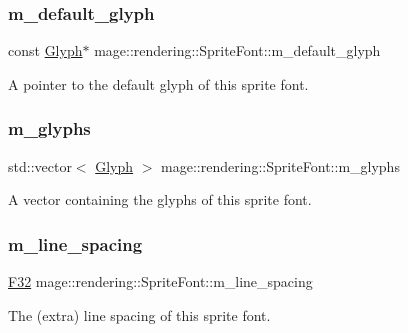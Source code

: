 \subsubsection{\texorpdfstring{m\+\_\+default\+\_\+glyph}{m\_default\_glyph}}
{\footnotesize\ttfamily const \hyperlink{structmage_1_1rendering_1_1_glyph}{Glyph}$\ast$ mage\+::rendering\+::\+Sprite\+Font\+::m\+\_\+default\+\_\+glyph\hspace{0.3cm}{\ttfamily [private]}}

A pointer to the default glyph of this sprite font. \hypertarget{classmage_1_1rendering_1_1_sprite_font_aba69731bf4701ab790b1575515de22b9}{}\label{classmage_1_1rendering_1_1_sprite_font_aba69731bf4701ab790b1575515de22b9} 
\subsubsection{\texorpdfstring{m\+\_\+glyphs}{m\_glyphs}}
{\footnotesize\ttfamily std\+::vector$<$ \hyperlink{structmage_1_1rendering_1_1_glyph}{Glyph} $>$ mage\+::rendering\+::\+Sprite\+Font\+::m\+\_\+glyphs\hspace{0.3cm}{\ttfamily [private]}}

A vector containing the glyphs of this sprite font. \hypertarget{classmage_1_1rendering_1_1_sprite_font_acc3c1cefce72befc5c16db5ec39dd61f}{}\label{classmage_1_1rendering_1_1_sprite_font_acc3c1cefce72befc5c16db5ec39dd61f} 
\subsubsection{\texorpdfstring{m\+\_\+line\+\_\+spacing}{m\_line\_spacing}}
{\footnotesize\ttfamily \hyperlink{namespacemage_aa97e833b45f06d60a0a9c4fc22ae02c0}{F32} mage\+::rendering\+::\+Sprite\+Font\+::m\+\_\+line\+\_\+spacing\hspace{0.3cm}{\ttfamily [private]}}

The (extra) line spacing of this sprite font. \hypertarget{classmage_1_1rendering_1_1_sprite_font_acdd3ca40befd9508a20011769046256e}{}\label{classmage_1_1rendering_1_1_sprite_font_acdd3ca40befd9508a20011769046256e} 
